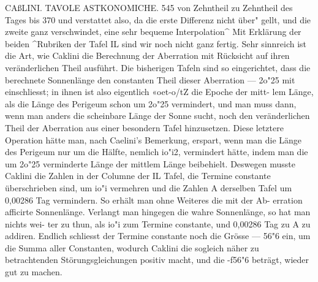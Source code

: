 \documentclass[12pt,a4paper]{article}
\begin{document}
\newpage
CAßLINI. TAVOLE ASTKONOMICHE. 545\newline
von Zehntheil zu Zehntheil des Tages bis 370 und verstattet also, da die erste Differenz nicht über" gellt, und die zweite ganz verschwindet, eine sehr bequeme Interpolation\^{}\newline
Mit Erklärung der beiden \^{}Rubriken der Tafel IL sind wir noch nicht ganz fertig. Sehr sinnreich\newline
ist die Art, wie Caklini die Berechnung der Aberration mit Rücksicht auf ihren veränderlichen Theil\newline
ausführt. Die bisherigen Tafeln sind so eingerichtet, dass die berechnete Sonnenlänge den constanten\newline
Theil dieser Aberration --- 2o"25 mit einschliesst; in ihnen ist also eigentlich «oet-o/tZ die Epoche der mitt-\newline
lem Länge, als die Länge des Perigeum schon um 2o"25 vermindert, und man muss dann, wenn man\newline
anders die scheinbare Länge der Sonne sucht, noch den veränderlichen Theil der Aberration aus einer\newline
besondern Tafel hinzusetzen. Diese letztere Operation hätte man, nach Caelini's Bemerkung, erspart,\newline
wenn man die Länge des Perigeum nur um die Hälfte, nemlich io"i2, vermindert hätte, indem man\newline
die um 2o"25 verminderte Länge der mittlem Länge beibehielt. Deswegen musste Caklini die Zahlen\newline
in der Columne der IL Tafel, die Termine constante überschrieben sind, um io"i vermehren und die\newline
Zahlen A derselben Tafel um 0,00286 Tag vermindern. So erhält man ohne Weiteres die mit der Ab-\newline
erration afficirte Sonnenlänge. Verlangt man hingegen die wahre Sonnenlänge, so hat man nichts wei-\newline
ter zu thun, als io"i zum Termine constante, und 0,00286 Tag zu A zu addiren. Endlich schliesst der\newline
Termine constante noch die Grösse --- 56"6 ein, um die Summa aller Constanten, wodurch Caklini die\newline
sogleich näher zu betrachtenden Störungsgleichungen positiv macht, und die -f56"6 beträgt, wieder\newline
gut zu machen.\newline
\end{document}
